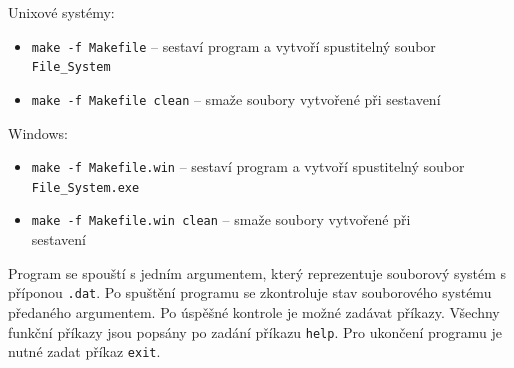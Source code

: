 \documentclass[12pt, a4paper]{article}
\begin{document}
Unixové systémy:
\begin{itemize}
    \item \texttt{make -f Makefile} -- sestaví program a vytvoří spustitelný soubor \\\texttt{File\_System}
    \item \texttt{make -f Makefile clean} -- smaže soubory vytvořené při sestavení
\end{itemize}

Windows:
\begin{itemize}
    \item \texttt{make -f Makefile.win} -- sestaví program a vytvoří spustitelný soubor \texttt{File\_System.exe}
    \item \texttt{make -f Makefile.win clean} -- smaže soubory vytvořené při \\ sestavení
\end{itemize}

Program se spouští s jedním argumentem, který reprezentuje souborový systém s příponou \texttt{.dat}.
Po spuštění programu se zkontroluje stav souborového systému předaného argumentem.
Po úspěšné kontrole je možné zadávat příkazy.
Všechny funkční příkazy jsou popsány po zadání příkazu \texttt{help}.
Pro ukončení programu je nutné zadat příkaz \texttt{exit}.
\pagebreak
\end{document}

